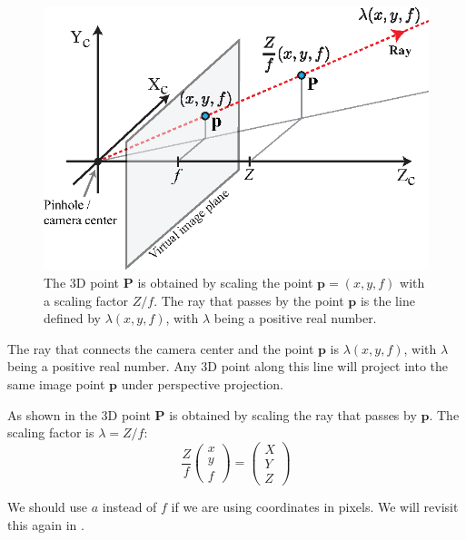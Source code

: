 \begin{figure}[h]
\centerline{
\includegraphics[width=0.75\linewidth]{figures/imaging_geometry/light_ray.eps}
}
\caption{The 3D point $\mathbf{P}$ is obtained by scaling the point $\mathbf{p}=(x,y,f)$ with a scaling factor $Z/f$. The ray that passes by the point $\mathbf{p}$ is the line defined by $\lambda (x,y,f)$, with $\lambda$ being a positive real number.}
\label{fig:coordinate_systems_ray}
\end{figure}

The ray that connects the camera center and the point $\mathbf{p}$ is $\lambda (x,y,f)$, with $\lambda$ being a positive real number. Any 3D point along this line will project into the same image point $\mathbf{p}$ under perspective projection. 

As shown in \fig{\ref{fig:coordinate_systems_ray}} the 3D point $\mathbf{P}$ is obtained by scaling the ray that passes by $\mathbf{p}$. The scaling factor is $\lambda = Z/f$:
\begin{equation}
    \frac{Z}{f}
    \begin{pmatrix}
    x\\
    y\\
    f
    \end{pmatrix}
    =
    \begin{pmatrix}
    X \\
    Y \\
    Z
    \end{pmatrix}
\end{equation}

We should use $a$ instead of $f$ if we are using coordinates in pixels. We will revisit this again in \chap{\ref{chapter:3D_learning_from_single_image}}.


